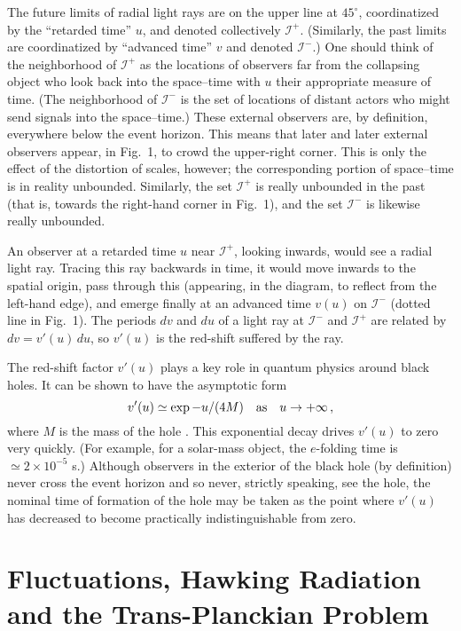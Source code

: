 \documentclass[11pt]{article}
\def\scrip{{\mathcal I}^-}
\def\scrif{{\mathcal I}^+}
\begin{document}
The future limits of radial light rays are on the upper line at $45^\circ$,
coordinatized by the ``retarded time'' $u$, and denoted collectively $\scrif$.
(Similarly, the past limits are coordinatized by ``advanced time'' $v$ and
denoted $\scrip$.) One should think of the neighborhood of $\scrif$ as the
locations of observers far from the collapsing object who look back into the
space--time with $u$ their appropriate measure of time. (The neighborhood of
$\scrip$ is the set of locations of distant actors who might send signals into
the space--time.) These external observers are, by definition, everywhere below
the event horizon.  This means that later and later external observers appear,
in Fig.~1, to crowd the upper-right corner.  This is only the effect of the
distortion of scales, however; the corresponding portion of space--time is in
reality unbounded. Similarly, the set $\scrif$ is really unbounded in the past
(that is, towards the right-hand corner in Fig.~1), and the set $\scrip$ is
likewise really unbounded.

An observer at a retarded time $u$ near $\scrif$, looking inwards, would see a
radial light ray.  Tracing this ray backwards in time, it would move inwards to
the spatial origin, pass through this (appearing, in the diagram, to reflect
from the left-hand edge), and emerge finally at an advanced time $v(u)$ on
$\scrip$ (dotted line in Fig.~1).  The periods $dv$ and $du$ of a light ray at
$\scrip$ and $\scrif$ are related by $dv=v'(u)\, du$, so $v'(u)$ is the
red-shift suffered by the ray.

The red-shift factor $v'(u)$ plays a key role in quantum physics around black
holes.  It can be shown to have the asymptotic form 
\begin{equation}
v'(u)\simeq \exp
-u/(4M)\quad\hbox{as}\quad u\to +\infty\, ,\label{eq:asympt}
\end{equation}
where $M$ is the mass of the hole \cite{MTW:1973,Helfer:2001}.  This
exponential decay drives $v'(u)$ to zero very quickly.  (For example, for a
solar-mass object, the $e$-folding time is $\simeq 2\times 10^{-5}$ s.)
Although observers in the exterior of the black hole (by definition) never
cross the event horizon and so never, strictly speaking, see the hole, the
nominal time of formation of the hole may be taken as the point where $v'(u)$
has decreased to become practically indistinguishable from zero.

\section{Fluctuations, 
Hawking Radiation\\ and the Trans-Planckian Problem}
\label{FHR}
\end{document}
